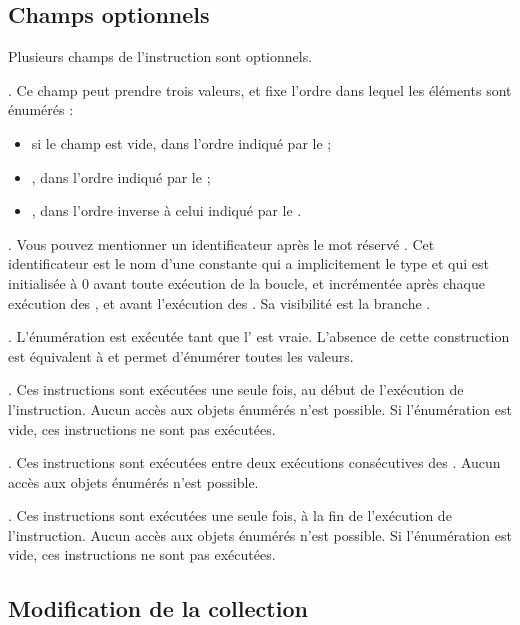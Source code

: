 \subsection{Champs optionnels}

Plusieurs champs de l'instruction  sont optionnels.

. Ce champ peut prendre trois valeurs, et fixe l'ordre dans lequel les éléments sont énumérés :
\begin{itemize}
  \item si le champ est vide, dans l'ordre indiqué par le  ;
  \item \galgas{<}, dans l'ordre indiqué par le  ;
  \item \galgas{>}, dans l'ordre inverse à celui indiqué par le .
\end{itemize}


. Vous pouvez mentionner un identificateur après le mot réservé . Cet identificateur est le nom d'une constante qui a implicitement le type  et qui est initialisée à 0 avant toute exécution de la boucle, et incrémentée après chaque exécution des , et avant l'exécution des . Sa visibilité est la branche .

. L'énumération est exécutée tant que l' est vraie. L'absence de cette construction est équivalent à  et permet d'énumérer toutes les valeurs.


. Ces instructions sont exécutées une seule fois, au début de l'exécution de l'instruction. Aucun accès aux objets énumérés n'est possible. Si l'énumération est vide, ces instructions ne sont pas exécutées.

. Ces instructions sont exécutées entre deux exécutions consécutives des . Aucun accès aux objets énumérés n'est possible.

. Ces instructions sont exécutées une seule fois, à la fin de l'exécution de l'instruction. Aucun accès aux objets énumérés n'est possible. Si l'énumération est vide, ces instructions ne sont pas exécutées.


\subsection{Modification de la collection}

